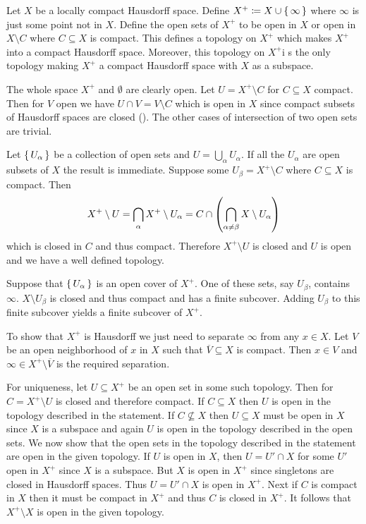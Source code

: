 \documentclass[letterpaper, 11pt, oneside]{book}
\begin{document}
\begin{thrm}\label{thrm: one_point_compactification}
  Let $X$ be a locally compact Hausdorff space.
  Define $X^{+} \coloneqq X \cup \set{\infty}$ where $\infty$ is just some point not in $X$.
  Define the open sets of $X^{+}$ to be open in $X$ or open in $X \setminus C$ where $C \subseteq X$ is compact.
  This defines a topology on $X^{+}$ which makes $X^{+}$ into a compact Hausdorff space.
  Moreover, this topology on $X^{+}$i s the only topology making $X^{+}$ a compact Hausdorff space with $X$ as a subspace.
\end{thrm}
\begin{pf}
  The whole space $X^{+}$ and $\emptyset$ are clearly open.
  Let $U = X^{+} \setminus C$ for $C \subseteq X$ compact.
  Then for $V$ open we have $U \cap V = V \setminus C$ which is open in $X$ since compact subsets of Hausdorff spaces are closed ().
  The other cases of intersection of two open sets are trivial.

  Let $\set{U_{\alpha}}$ be a collection of open sets and $U = \bigcup_{\alpha} U_{\alpha}$.
  If all the $U_{\alpha}$ are open subsets of $X$ the result is immediate.
  Suppose some $U_{\beta} = X^{+} \setminus C$ where $C \subseteq X$ is compact.
  Then
  \[
    X^{+} \setminus U = \bigcap_{\alpha} X^{+} \setminus U_{\alpha} = C \cap \pqty{\bigcap_{\alpha \neq \beta} X \setminus U_{\alpha}}
  \]
  which is closed in $C$ and thus compact.
  Therefore $X^{+} \setminus U$ is closed and $U$ is open and we have a well defined topology.

  Suppose that $\set{U_{\alpha}}$ is an open cover of $X^{+}$.
  One of these sets, say $U_{\beta}$, contains $\infty$.
  $X \setminus U_{\beta}$ is closed and thus compact and has a finite subcover.
  Adding $U_{\beta}$ to this finite subcover yields a finite subcover of $X^{+}$.

  To show that $X^{+}$ is Hausdorff we just need to separate $\infty$ from any $x \in X$.
  Let $V$ be an open neighborhood of $x$ in $X$ such that $\overline{V} \subseteq X$ is compact.
  Then $x \in V$ and $\infty \in X^{+} \setminus \overline{V}$ is the required separation.

  For uniqueness, let $U \subseteq X^{+}$ be an open set in some such topology.
  Then for $C = X^{+} \setminus U$ is closed and therefore compact.
  If $C \subseteq X$ then $U$ is open in the topology described in the statement.
  If $C \not\subseteq X$ then $U \subseteq X$ must be open in $X$ since $X$ is a subspace and again $U$ is open in the topology described in the open sets.
  We now show that the open sets in the topology described in the statement are open in the given topology.
  If $U$ is open in $X$, then $U = U' \cap X$ for some $U'$ open in $X^{+}$ since $X$ is a subspace.
  But $X$ is open in $X^{+}$ since singletons are closed in Hausdorff spaces.
  Thus $U = U' \cap X$ is open in $X^{+}$.
  Next if $C$ is compact in $X$ then it must be compact in $X^{+}$ and thus $C$ is closed in $X^{+}$.
  It follows that $X^{+} \setminus X$ is open in the given topology.
\end{pf}
\end{document}
